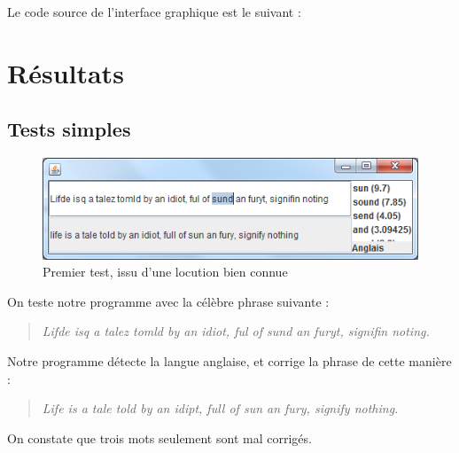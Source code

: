 \documentclass[10pt,a4paper]{article}
\begin{document}
Le code source de l'interface graphique est le suivant : 



\section{Résultats}

\subsection{Tests simples}

\begin{figure}[H]
\begin{centering}
\includegraphics[scale=1.]{IHM_raw}
\par\end{centering}
\caption{Premier test, issu d'une locution bien connue}
\end{figure}

On teste notre programme avec la célèbre phrase suivante : 

\begin{quote} 
\centering 
\textit{Lifde isq a talez tomld by an idiot, ful of sund an furyt, signifin noting.}
\end{quote}

Notre programme détecte la langue anglaise, et corrige la phrase de cette manière : 

\begin{quote} 
\centering 
\textit{Life is a tale told by an idipt, full of sun an fury, signify nothing.}\\
\end{quote}

On constate que trois mots seulement sont mal corrigés.\\
\end{document}
